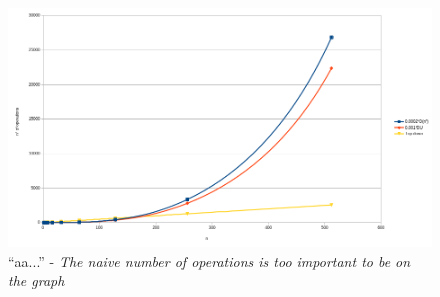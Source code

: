 \documentclass[]{article}
\begin{document}
\begin{figure}[h]
  \label{fig:plr}
  \includegraphics[width=\textwidth]{as/as}
  \caption{``aa...'' - \textit{The naive number of operations is too important to be on
      the graph}}
\end{figure}
\end{document}
